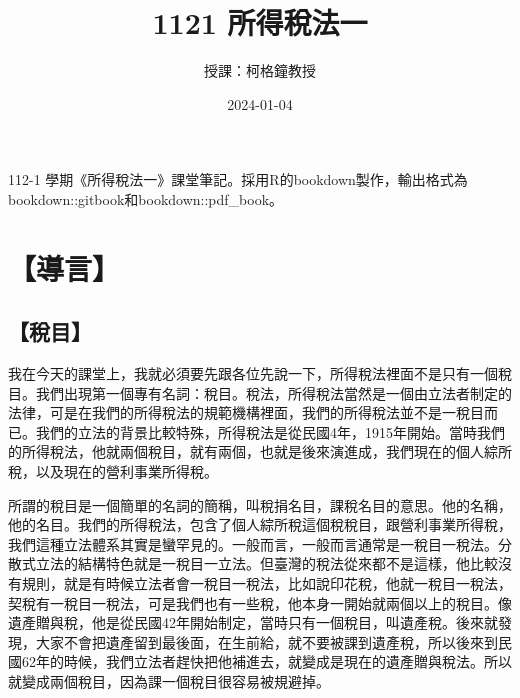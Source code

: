 \documentclass[oneside,sub3section]{ctexbook}
\title{1121 所得稅法一}
\author{授課：柯格鐘教授}
\date{2024-01-04}
\begin{document}
\maketitle

\thispagestyle{empty}

\mbox{}
\vspace{10cm}
\begin{center}

    112-1 學期《所得稅法一》課堂筆記。採用R的bookdown製作，輸出格式為bookdown::gitbook和bookdown::pdf\_book。
    
\end{center}

\setlength{\abovedisplayskip}{-5pt}
\setlength{\abovedisplayshortskip}{-5pt}



{
\setcounter{tocdepth}{3}
\tableofcontents
}



\mainmatter

\hypertarget{ux5c0eux8a00}{%
\chapter{【導言】}\label{ux5c0eux8a00}}

\hypertarget{ux7a05ux76ee}{%
\section{【稅目】}\label{ux7a05ux76ee}}

我在今天的課堂上，我就必須要先跟各位先說一下，所得稅法裡面不是只有一個稅目。我們出現第一個專有名詞：稅目。稅法，所得稅法當然是一個由立法者制定的法律，可是在我們的所得稅法的規範機構裡面，我們的所得稅法並不是一稅目而已。我們的立法的背景比較特殊，所得稅法是從民國4年，1915年開始。當時我們的所得稅法，他就兩個稅目，就有兩個，也就是後來演進成，我們現在的個人綜所稅，以及現在的營利事業所得稅。

所謂的稅目是一個簡單的名詞的簡稱，叫稅捐名目，課稅名目的意思。他的名稱，他的名目。我們的所得稅法，包含了個人綜所稅這個稅稅目，跟營利事業所得稅，我們這種立法體系其實是蠻罕見的。一般而言，一般而言通常是一稅目一稅法。分散式立法的結構特色就是一稅目一立法。但臺灣的稅法從來都不是這樣，他比較沒有規則，就是有時候立法者會一稅目一稅法，比如說印花稅，他就一稅目一稅法，契稅有一稅目一稅法，可是我們也有一些稅，他本身一開始就兩個以上的稅目。像遺產贈與稅，他是從民國42年開始制定，當時只有一個稅目，叫遺產稅。後來就發現，大家不會把遺產留到最後面，在生前給，就不要被課到遺產稅，所以後來到民國62年的時候，我們立法者趕快把他補進去，就變成是現在的遺產贈與稅法。所以就變成兩個稅目，因為課一個稅目很容易被規避掉。
\end{document}
